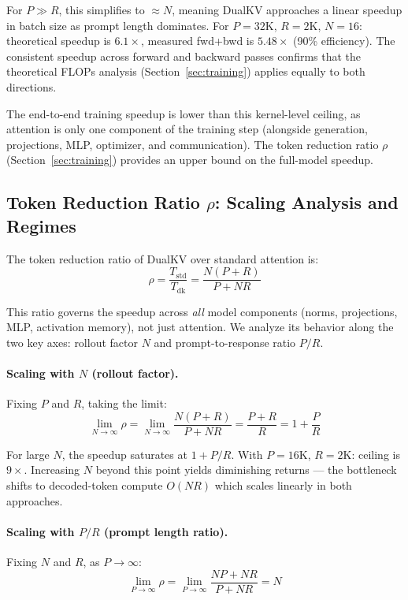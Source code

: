 \documentclass{article}
\begin{document}
For $P \gg R$, this simplifies to $\approx N$, meaning DualKV approaches a linear speedup in batch size as prompt length dominates. For $P{=}32\text{K}$, $R{=}2\text{K}$, $N{=}16$: theoretical speedup is $6.1\times$, measured fwd+bwd is $5.48\times$ (90\% efficiency). The consistent speedup across forward and backward passes confirms that the theoretical FLOPs analysis (Section~\ref{sec:training}) applies equally to both directions.

The end-to-end training speedup is lower than this kernel-level ceiling, as attention is only one component of the training step (alongside generation, projections, MLP, optimizer, and communication). The token reduction ratio $\rho$ (Section~\ref{sec:training}) provides an upper bound on the full-model speedup.

\subsection{Token Reduction Ratio \texorpdfstring{$\rho$}{ρ}: Scaling Analysis and Regimes}
\label{app:rho-scaling}

The token reduction ratio of DualKV over standard attention is:
\begin{equation}
  \rho = \frac{T_{\text{std}}}{T_{\text{dk}}} = \frac{N(P + R)}{P + NR}
  \label{eq:rho}
\end{equation}

This ratio governs the speedup across \emph{all} model components (norms, projections, MLP, activation memory), not just attention. We analyze its behavior along the two key axes: rollout factor $N$ and prompt-to-response ratio $P/R$.

\paragraph{Scaling with $N$ (rollout factor).} Fixing $P$ and $R$, taking the limit:
\begin{equation}
  \lim_{N \to \infty} \rho = \lim_{N \to \infty} \frac{N(P+R)}{P + NR} = \frac{P + R}{R} = 1 + \frac{P}{R}
\end{equation}

For large $N$, the speedup saturates at $1 + P/R$. With $P{=}16\text{K}$, $R{=}2\text{K}$: ceiling is $9\times$. Increasing $N$ beyond this point yields diminishing returns --- the bottleneck shifts to decoded-token compute $O(NR)$ which scales linearly in both approaches.

\paragraph{Scaling with $P/R$ (prompt length ratio).} Fixing $N$ and $R$, as $P \to \infty$:
\begin{equation}
  \lim_{P \to \infty} \rho = \lim_{P \to \infty} \frac{NP + NR}{P + NR} = N
\end{equation}
\end{document}

